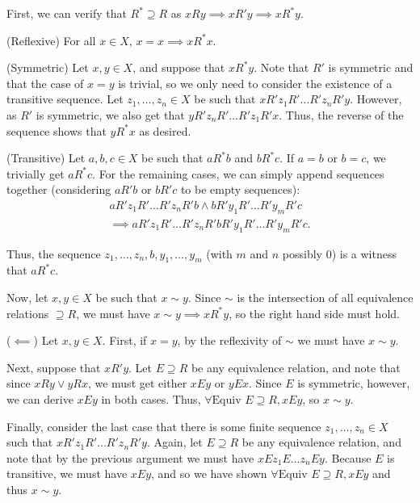 \documentclass[12pt]{article}
\begin{document}
\begin{enumerate}
    First, we can verify that $R^\ast \supseteq R$ as $xRy \implies xR'y \implies xR^\ast y$. 

    (Reflexive) For all $x \in X$, $x = x \implies xR^\ast x$.

    (Symmetric) Let $x,y \in X$, and suppose that $xR^\ast y$. Note that $R'$ is symmetric and that the case of $x=y$ is trivial, so we only need to consider the existence of a transitive sequence. Let $z_1,\dots,z_n \in X$ be such that $xR'z_1R'\dots R'z_nR'y$. However, as $R'$ is symmetric, we also get that $yR'z_nR'\dots R'z_1R'x$. Thus, the reverse of the sequence shows that $yR^\ast x$ as desired.

    (Transitive) Let $a,b,c \in X$ be such that $aR^\ast b$ and $b R^\ast c$. If $a =b$ or $b=c$, we trivially get $a R^\ast c$. For the remaining cases, we can simply append sequences together (considering $aR'b$ or $bR'c$ to be empty sequences):
    \begin{align*}
        aR'z_1R'\dots R'z_nR'b \land bR'y_1R'\dots R'y_mR'c \\
        \implies aR'z_1R'\dots R'z_nR'bR'y_1R'\dots R'y_mR'c.
    \end{align*}

    Thus, the sequence $z_1,\dots,z_n,b,y_1,\dots,y_m$ (with $m$ and $n$ possibly 0) is a witness that $aR^\ast c$.

    Now, let $x,y \in X$ be such that $x \sim y$. Since $\sim$ is the intersection of all equivalence relations $\supseteq R$, we must have $x \sim y \implies x R^\ast y$, so the right hand side must hold.

    ($\impliedby$) Let $x,y \in X$. First, if $x =y$, by the reflexivity of $\sim$ we must have $x \sim y$.
    
    Next, suppose that $xR'y$. Let $E \supseteq R$ be any equivalence relation, and note that since $xRy \lor yRx$, we must get either $xEy$ or $yEx$. Since $E$ is symmetric, however, we can derive $xEy$ in both cases. Thus, $\forall \text{Equiv }E\supseteq R, xEy$, so $x \sim y$.
    
    Finally, consider the last case that there is some finite sequence $z_1,\dots,z_n \in X$ such that $xR'z_1R'\dots R'z_nR'y$. Again, let $E \supseteq R$ be any equivalence relation, and note that by the previous argument we must have $xEz_1E\dots z_nEy$. Because $E$ is transitive, we must have $xEy$, and so we have shown $\forall \text{Equiv } E\supseteq R, xEy$ and thus $x \sim y$.

\end{enumerate}
\end{document}
